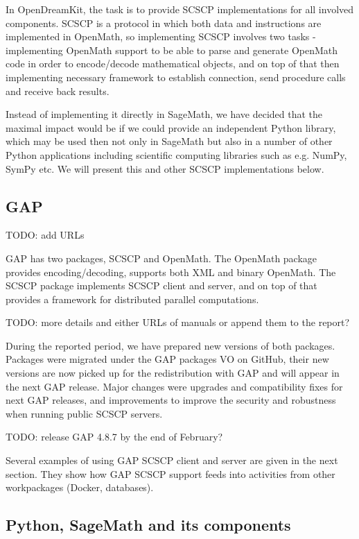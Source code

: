 \documentclass{deliverablereport}
\begin{document}
In OpenDreamKit, the task is to provide SCSCP implementations
for all involved components. SCSCP is a protocol in which 
both data and instructions are implemented in OpenMath, so
implementing SCSCP involves two tasks - implementing OpenMath
support to be able to parse and generate OpenMath code in order
to encode/decode mathematical objects, and on top of that 
then implementing necessary framework to establish connection,
send procedure calls and receive back results.

Instead of implementing it directly in SageMath, we have
decided that the maximal impact would be if we could provide
an independent Python library, which may be used then not
only in SageMath but also in a number of other Python applications
including scientific computing libraries such as e.g. NumPy,
SymPy etc. We will present this and other SCSCP implementations
below.


\subsection{GAP}

TODO: add URLs

GAP has two packages, SCSCP and OpenMath. The OpenMath package
provides encoding/decoding, supports both XML and binary OpenMath.
The SCSCP package implements SCSCP client and server, and on top of
that provides a framework for distributed parallel computations.

TODO: more details and either URLs of manuals or append them to the report?

During the reported period, we have prepared new versions of 
both packages. Packages were migrated under the GAP packages VO
on GitHub, their new versions are now picked up for the redistribution
with GAP and will appear in the next GAP release. Major changes
were upgrades and compatibility fixes for next GAP releases, 
and improvements to improve the security and robustness when
running public SCSCP servers. 

TODO: release GAP 4.8.7 by the end of February?

Several examples of using GAP SCSCP client and server are given
in the next section. They show how GAP SCSCP support feeds into
activities from other workpackages (Docker, databases).


\subsection{Python, SageMath and its components}
\end{document}
